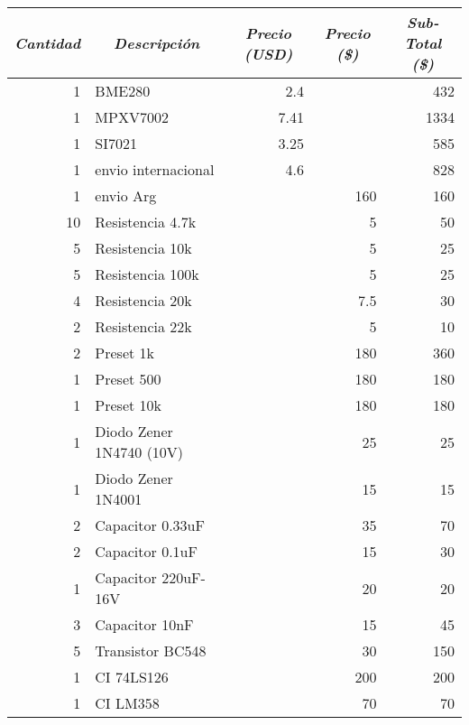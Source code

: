 
\begin{table}[h]
	\centering
	\begin{tabular}{|r|l|l|r|r|}
		\hline
		\multicolumn{1}{|c|}{\textit{\textbf{Cantidad}}} & \multicolumn{1}{c|}{\textit{\textbf{Descripción}}} & \multicolumn{1}{c|}{\textit{\textbf{Precio (USD)}}} & \multicolumn{1}{c|}{\textit{\textbf{Precio (\$)}}} & \multicolumn{1}{c|}{\textit{\textbf{Sub-Total  (\$)}}} \\ \hline
		1 & BME280 & \multicolumn{1}{r|}{2.4} & \multicolumn{1}{l|}{} & 432 \\ \hline
		1 & MPXV7002 & \multicolumn{1}{r|}{7.41} & \multicolumn{1}{l|}{} & 1334 \\ \hline
		1 & SI7021 & \multicolumn{1}{r|}{3.25} & \multicolumn{1}{l|}{} & 585 \\ \hline
		1 & envio internacional & \multicolumn{1}{r|}{4.6} & \multicolumn{1}{l|}{} & 828 \\ \hline
		1 & envio Arg &  & 160 & 160 \\ \hline
		10 & Resistencia 4.7k &  & 5 & 50 \\ \hline
		5 & Resistencia 10k &  & 5 & 25 \\ \hline
		5 & Resistencia 100k &  & 5 & 25 \\ \hline
		4 & Resistencia 20k &  & 7.5 & 30 \\ \hline
		2 & Resistencia 22k &  & 5 & 10 \\ \hline
		2 & Preset 1k &  & 180 & 360 \\ \hline
		1 & Preset 500 & \multicolumn{1}{r|}{} & 180 & 180 \\ \hline
		1 & Preset 10k &  & 180 & 180 \\ \hline
		1 & Diodo Zener 1N4740 (10V) &  & 25 & 25 \\ \hline
		1 & Diodo Zener 1N4001 &  & 15 & 15 \\ \hline
		2 & Capacitor 0.33uF &  & 35 & 70 \\ \hline
		2 & Capacitor 0.1uF &  & 15 & 30 \\ \hline
		1 & Capacitor 220uF-16V &  & 20 & 20 \\ \hline
		3 & Capacitor 10nF &  & 15 & 45 \\ \hline
		5 & Transistor BC548 &  & 30 & 150 \\ \hline
		1 & CI 74LS126 &  & 200 & 200 \\ \hline
		1 & CI LM358 &  & 70 & 70 \\ \hline

\end{tabular}
\end{table}
